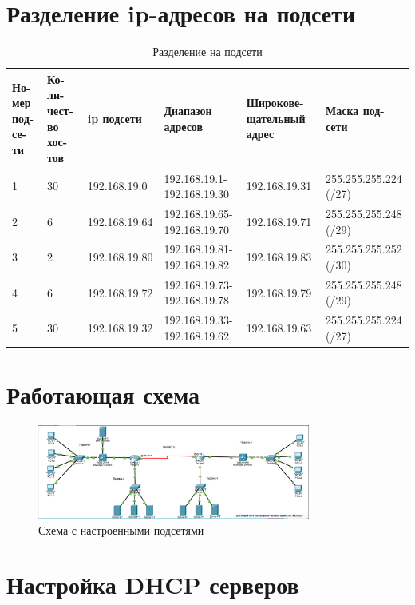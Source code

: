 \section{Разделение ip-адресов на подсети}

\begin{table}[H]
    \centering
    \caption{Разделение на подсети}
    \label{tab:networks}
    \begin{tabular}{|p{0.8cm}|p{1cm}|p{3cm}|p{3cm}|p{3cm}|p{3.2cm}|}
        \hline
        Но-мер под-се-ти & Ко-ли-чест-во хос-тов & ip подсети & Диапазон адресов & Широкове-щательный адрес & Маска под-сети \\
        \hline
        1 & 30 & 192.168.19.0 & 192.168.19.1-192.168.19.30 & 192.168.19.31 & 255.255.255.224 (/27) \\
        \hline
        2 & 6 & 192.168.19.64 & 192.168.19.65-192.168.19.70 & 192.168.19.71 & 255.255.255.248 (/29) \\
        \hline
        3 & 2 & 192.168.19.80 & 192.168.19.81-192.168.19.82 & 192.168.19.83 & 255.255.255.252 (/30) \\
        \hline
        4 & 6 & 192.168.19.72 & 192.168.19.73-192.168.19.78 & 192.168.19.79 & 255.255.255.248 (/29) \\
        \hline
        5 & 30 & 192.168.19.32 & 192.168.19.33-192.168.19.62 & 192.168.19.63 & 255.255.255.224 (/27) \\
        \hline
    \end{tabular}
\end{table}

\section{Работающая схема}

\begin{figure}[H]
    \centering
    \includegraphics[width=0.8\textwidth]{img/content/schema.png}
    \caption{Схема с настроенными подсетями}
\end{figure}

\section{Настройка DHCP серверов}

